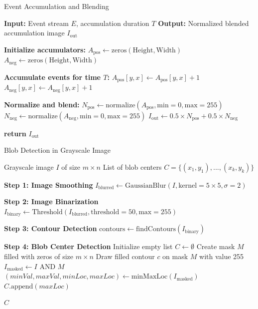 \begin{algorithm}[H]
\caption{Event Accumulation and Blending}
\label{alg:even_accumulation}
\begin{algorithmic}[1]
\State \textbf{Input:} Event stream $E$, accumulation duration $T$
\State \textbf{Output:} Normalized blended accumulation image $I_{\text{out}}$

\State \textbf{Initialize accumulators:}
\State $A_{\text{pos}} \gets \text{zeros}(\text{Height}, \text{Width})$ 
\State $A_{\text{neg}} \gets \text{zeros}(\text{Height}, \text{Width})$ 

\State \textbf{Accumulate events for time $T$:}
        \State $A_{\text{pos}}[y,x] \gets A_{\text{pos}}[y,x] + 1$
    \Else
        \State $A_{\text{neg}}[y,x] \gets A_{\text{neg}}[y,x] + 1$
    \EndIf
\EndFor

\State \textbf{Normalize and blend:}
\State $N_{\text{pos}} \gets \text{normalize}(A_{\text{pos}}, \text{min}=0, \text{max}=255)$
\State $N_{\text{neg}} \gets \text{normalize}(A_{\text{neg}}, \text{min}=0, \text{max}=255)$
\State $I_{\text{out}} \gets 0.5 \times N_{\text{pos}} + 0.5 \times N_{\text{neg}}$

\State \textbf{return} $I_{\text{out}}$
\end{algorithmic}
\end{algorithm}

%

\begin{algorithm}[H]
\caption{Blob Detection in Grayscale Image}
\label{alg:blob_detection}
\begin{algorithmic}[1]
\Require Grayscale image $I$ of size $m \times n$
\Ensure List of blob centers $C = \{(x_1,y_1), ..., (x_k,y_k)\}$

\State \textbf{Step 1: Image Smoothing}
\State $I_{\text{blurred}} \gets \text{GaussianBlur}(I, \text{kernel}=5\times5, \sigma=2)$

\State \textbf{Step 2: Image Binarization}
\State $I_{\text{binary}} \gets \text{Threshold}(I_{\text{blurred}}, \text{threshold}=50, \text{max}=255)$

\State \textbf{Step 3: Contour Detection}
\State $\text{contours} \gets \text{findContours}(I_{\text{binary}})$

\State \textbf{Step 4: Blob Center Detection}
\State Initialize empty list $C \gets \emptyset$
    \State Create mask $M$ filled with zeros of size $m \times n$
    \State Draw filled contour $c$ on mask $M$ with value 255
    \State $I_{\text{masked}} \gets I \text{ AND } M$ 
    \State $(minVal, maxVal, minLoc, maxLoc) \gets \text{minMaxLoc}(I_{\text{masked}})$
        \State $C.\text{append}(maxLoc)$ 
    \EndIf
\EndFor

\State \Return $C$
\end{algorithmic}
\end{algorithm}

